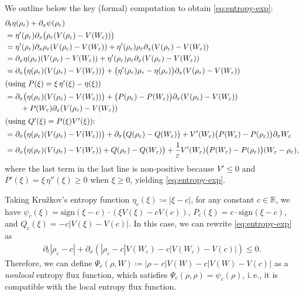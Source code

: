 \documentclass[10pt]{amsart}
\theoremstyle{plain}
\theoremstyle{definition}
\numberwithin{equation}{section}
\newcommand{\R}{\mathbb{R}}
\newcommand{\sgn}[1]{\mathrm{sign}\left(#1\right)}
\begin{document}
We outline below the key (formal) computation to obtain \cref{eq:entropy-exp}:
\begin{align*}
&\partial_t \eta(\rho_\varepsilon) + \partial_x \psi(\rho_\varepsilon)\\
&= \eta'(\rho_\varepsilon) \partial_x \big( \rho_\varepsilon (V(\rho_\varepsilon) - V(W_\varepsilon)) \big) \\
&= \eta'(\rho_\varepsilon) \partial_x \rho_\varepsilon (V(\rho_\varepsilon) - V(W_\varepsilon)) + \eta'(\rho_\varepsilon) \rho_\varepsilon \partial_x (V(\rho_\varepsilon) - V(W_\varepsilon)) \\
&= \partial_x \eta(\rho_\varepsilon) (V(\rho_\varepsilon) - V(W_\varepsilon)) + \eta'(\rho_\varepsilon) \rho_\varepsilon \partial_x (V(\rho_\varepsilon) - V(W_\varepsilon)) \\
&= \partial_x \big( \eta(\rho_\varepsilon)(V(\rho_\varepsilon) - V(W_\varepsilon)) \big) + \big( \eta'(\rho_\varepsilon) \rho_\varepsilon - \eta(\rho_\varepsilon) \big) \partial_x (V(\rho_\varepsilon) - V(W_\varepsilon)) \\
\intertext{(using \( P(\xi) = \xi\,\eta'(\xi) - \eta(\xi) \))}
&= \partial_x \big( \eta(\rho_\varepsilon)(V(\rho_\varepsilon) - V(W_\varepsilon)) \big) 
+ \big( P(\rho_\varepsilon) - P(W_\varepsilon) \big) \partial_x (V(\rho_\varepsilon) - V(W_\varepsilon)) \\
&\qquad + P(W_\varepsilon) \partial_x (V(\rho_\varepsilon) - V(W_\varepsilon)) \\
\intertext{(using \( Q'(\xi) = P(\xi) V'(\xi) \)):}
&= \partial_x \big( \eta(\rho_\varepsilon)(V(\rho_\varepsilon) - V(W_\varepsilon)) \big) 
+ \partial_x \big(Q(\rho_\varepsilon) - Q(W_\varepsilon) \big)
+ V'(W_\varepsilon) \big( P(W_\varepsilon) - P(\rho_\varepsilon) \big) \partial_x W_\varepsilon \\
&= \partial_x \big( \eta(\rho_\varepsilon)(V(\rho_\varepsilon) - V(W_\varepsilon)) + Q(\rho_\varepsilon) - Q(W_\varepsilon) \big)
+ \frac{1}{\varepsilon} V'(W_\varepsilon) \big( P(W_\varepsilon) - P(\rho_\varepsilon) \big)(W_\varepsilon - \rho_\varepsilon),
\end{align*}
where the last term in the last line is non-positive because $V'\leq0$ and $P'(\xi)=\xi\,\eta''(\xi)\ge0$ when $\xi\geq0$, yielding \cref{eq:entropy-exp}.

Taking Kru\v{z}kov's entropy function $\eta_c(\xi)\coloneqq |\xi-c|$, for any constant $c\in\R$, we have $\psi_c(\xi)=\sgn{\xi-c}\cdot(\xi V(\xi)-cV(c))$, $P_c(\xi)=c\cdot\sgn{\xi-c}$, and $Q_c(\xi)=-c|V(\xi)-V(c)|$. In this case, we can rewrite \cref{eq:entropy-exp} as 
\begin{align}\label{eq:entr-k}
    \partial_t |\rho_\varepsilon-c| + \partial_x \left( |\rho_\varepsilon-c|V(W_\varepsilon) - c|V(W_\varepsilon)-V(c)| \right) \leq 0.
\end{align}
Therefore, we can define $\Psi_c(\rho,W)\coloneqq |\rho-c|V(W) - c|V(W)-V(c)|$ as a \emph{nonlocal} entropy flux function, which satisfies $\Psi_c(\rho,\rho)=\psi_c(\rho)$, i.\,e., it is compatible with the local entropy flux function. 
\end{document}
